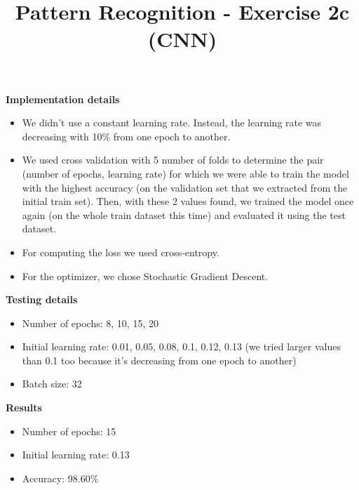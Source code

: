 \documentclass[10pt,a4paper,fullpage]{article}
\begin{document}
\title{Pattern Recognition - Exercise 2c (CNN)}
\author{}
\predate{}
\postdate{}
\date{\vspace{-5ex}}
\maketitle


\textbf{Implementation details}
\begin{itemize}
	\item We didn't use a constant learning rate. Instead, the learning rate was decreasing with 10\% from one epoch to another.
	\item We used cross validation with 5 number of folds to determine the pair (number of epochs, learning rate) for which we were able to train the model with the highest accuracy (on the validation set that we extracted from the initial train set). Then, with these 2 values found, we trained the model once again (on the whole train dataset this time) and evaluated it using the test dataset.
	\item For computing the loss we used cross-entropy.
	\item For the optimizer, we chose Stochastic Gradient Descent.
\end{itemize}


\textbf{Testing details}
\begin{itemize}
	\item Number of epochs: 8, 10, 15, 20
	\item Initial learning rate: 0.01, 0.05, 0.08, 0.1, 0.12, 0.13 (we tried larger values than 0.1 too because it's decreasing from one epoch to another)
	\item Batch size: 32
\end{itemize}


\textbf{Results}
\begin{itemize}
	\item Number of epochs: 15
	\item Initial learning rate: 0.13
	\item Accuracy: 98.60\%
\end{itemize}
\end{document}
